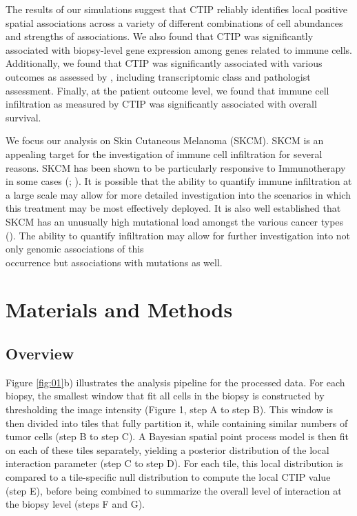 \documentclass[
]{book}
\begin{document}
The results of our simulations suggest that CTIP reliably identifies
local positive spatial associations across a variety of different
combinations of cell abundances and strengths of associations. We also found that CTIP was significantly
associated with biopsy-level gene expression among genes related to immune cells. Additionally, we found that CTIP was significantly associated with various outcomes as assessed by \citet{Akbani15}, including transcriptomic class and pathologist assessment.
Finally, at the patient outcome level, we found that immune cell infiltration as
measured by CTIP was significantly associated
with overall survival.

We focus our analysis on Skin Cutaneous Melanoma
(SKCM). SKCM is an appealing target for the investigation of
immune cell infiltration for several reasons.
SKCM has been shown
to be particularly responsive to Immunotherapy in some cases
(\citet{Franklin17}; \citet{Achkar17}). It is possible that
the ability to quantify immune infiltration at a large scale
may allow for more detailed investigation into the scenarios in
which this treatment may be most effectively deployed. It is also
well established that SKCM has an unusually high mutational load
amongst the various cancer types (\citet{Berger12}). The
ability to quantify infiltration may allow for further
investigation into not only genomic associations of this\\
occurrence but associations with mutations as well.

\hypertarget{materials-and-methods}{%
\chapter{Materials and Methods}\label{materials-and-methods}}

\hypertarget{overview}{%
\section{Overview}\label{overview}}

Figure \ref{fig:01}b) illustrates the analysis pipeline for the processed data. For each
biopsy, the smallest window that fit all cells in the biopsy is constructed by thresholding the image intensity
(Figure 1, step A to step B).
This window is then divided into tiles that fully partition it,
while containing similar numbers of tumor cells (step B to step C). A Bayesian spatial
point process model is then fit on each of these tiles separately,
yielding a posterior distribution of the local interaction parameter (step C to step D).
For each tile, this local distribution is compared to a
tile-specific null distribution to compute the local CTIP value (step E), before being combined to summarize
the overall level of interaction at the biopsy level (steps F and G).
\end{document}
